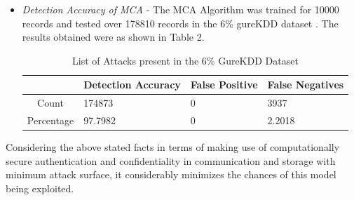 \documentclass[conference]{sig-alternate-05-2015}
\begin{document}
\begin{itemize}
  \item \textit{Detection Accuracy of MCA} - The MCA Algorithm was trained for 10000 records and tested over 178810 records in the 6\% gureKDD dataset \cite{ddos}. The results obtained were as shown in Table 2.
  \begin{center}
  \begin{table}[H]
  \centering
  \caption{List of Attacks present in the 6\% GureKDD Dataset}
  \begin{tabular}{ | c | p{1.5cm} | p{1.5cm} | p{1.5cm} | }
    \hline
     & Detection Accuracy & False Positive & False Negatives \\ \hline
    Count & 174873 & 0 & 3937 \\ \hline 
    Percentage & 97.7982 & 0 & 2.2018 \\  \hline
  \end{tabular}
  \end{table}
\end{center}
\end{itemize}
Considering the above stated facts in terms of making use of computationally secure authentication and confidentiality in communication and storage with minimum attack surface, it considerably minimizes the chances of this model being exploited.
\end{document}
